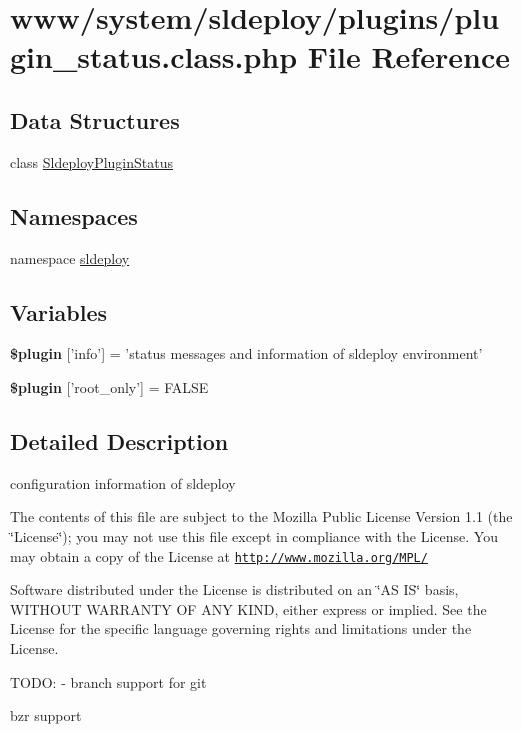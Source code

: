 \hypertarget{plugin__status_8class_8php}{
\section{www/system/sldeploy/plugins/plugin\_\-status.class.php File Reference}
\label{plugin__status_8class_8php}
}
\subsection*{Data Structures}
\begin{DoxyCompactItemize}
\item 
class \hyperlink{class_sldeploy_plugin_status}{SldeployPluginStatus}
\end{DoxyCompactItemize}
\subsection*{Namespaces}
\begin{DoxyCompactItemize}
\item 
namespace \hyperlink{namespacesldeploy}{sldeploy}
\end{DoxyCompactItemize}
\subsection*{Variables}
\begin{DoxyCompactItemize}
\item 
\hypertarget{plugin__status_8class_8php_a95edf69ebbeaeedb03bab3bb010f2af9}{
{\bfseries \$plugin} \mbox{[}'info'\mbox{]} = 'status messages and information of sldeploy environment'}
\label{plugin__status_8class_8php_a95edf69ebbeaeedb03bab3bb010f2af9}

\item 
\hypertarget{plugin__status_8class_8php_a1d302084fa15e3efe6c843cbb5096985}{
{\bfseries \$plugin} \mbox{[}'root\_\-only'\mbox{]} = FALSE}
\label{plugin__status_8class_8php_a1d302084fa15e3efe6c843cbb5096985}

\end{DoxyCompactItemize}


\subsection{Detailed Description}
configuration information of sldeploy

The contents of this file are subject to the Mozilla Public License Version 1.1 (the \char`\"{}License\char`\"{}); you may not use this file except in compliance with the License. You may obtain a copy of the License at \href{http://www.mozilla.org/MPL/}{\tt http://www.mozilla.org/MPL/}

Software distributed under the License is distributed on an \char`\"{}AS IS\char`\"{} basis, WITHOUT WARRANTY OF ANY KIND, either express or implied. See the License for the specific language governing rights and limitations under the License.

TODO: -\/ branch support for git
\begin{DoxyItemize}
\item bzr support 
\end{DoxyItemize}